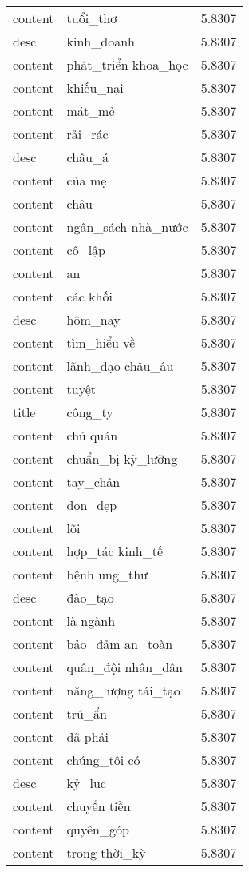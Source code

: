\documentclass{article}
\begin{document}
\begin{tabular}{lll}
content & tuổi\_thơ & 5.8307\\
desc & kinh\_doanh & 5.8307\\
content & phát\_triển khoa\_học & 5.8307\\
content & khiếu\_nại & 5.8307\\
content & mát\_mẻ & 5.8307\\
content & rải\_rác & 5.8307\\
desc & châu\_á & 5.8307\\
content & của mẹ & 5.8307\\
content & châu & 5.8307\\
content & ngân\_sách nhà\_nước & 5.8307\\
content & cô\_lập & 5.8307\\
content & an & 5.8307\\
content & các khối & 5.8307\\
desc & hôm\_nay & 5.8307\\
content & tìm\_hiểu về & 5.8307\\
content & lãnh\_đạo châu\_âu & 5.8307\\
content & tuyệt & 5.8307\\
title & công\_ty & 5.8307\\
content & chủ quán & 5.8307\\
content & chuẩn\_bị kỹ\_lưỡng & 5.8307\\
content & tay\_chân & 5.8307\\
content & dọn\_dẹp & 5.8307\\
content & lõi & 5.8307\\
content & hợp\_tác kinh\_tế & 5.8307\\
content & bệnh ung\_thư & 5.8307\\
desc & đào\_tạo & 5.8307\\
content & là ngành & 5.8307\\
content & bảo\_đảm an\_toàn & 5.8307\\
content & quân\_đội nhân\_dân & 5.8307\\
content & năng\_lượng tái\_tạo & 5.8307\\
content & trú\_ẩn & 5.8307\\
content & đã phải & 5.8307\\
content & chúng\_tôi có & 5.8307\\
desc & kỷ\_lục & 5.8307\\
content & chuyển tiền & 5.8307\\
content & quyên\_góp & 5.8307\\
content & trong thời\_kỳ & 5.8307\\

\end{tabular}
\end{document}
